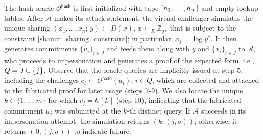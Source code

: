 \documentclass{iacrtrans}
\begin{document}
The hash oracle $\mathcal{O}^{\mathsf{hash}}$
is first initialized with tape
$[\hspace{0.5pt}h_1, \dots, h_m\hspace{0.5pt}]$
and empty lookup tables.
After $\mathcal{A}$ makes its attack statement,
the virtual challenger simulates the unique sharing
$(x_1, \dots, x_n;\hspace{2pt} y) \leftarrow D(x),
\hspace{2pt} x \leftarrow _R\mathbb{Z}_q,$ that is
subject to the constraint \eqref{shamir_sharing_constraint};
in particular, $x_j = \log y^*$.
It then generates commitments
$\{u_i\}_{i \in J}$ and feeds them
along with $y$ and $\{x_i\}_{i \in J}$
to $\mathcal{A}$, who proceeds
to impersonation
and generates a proof of the expected form,
i.e., $Q = J \cup \{\hspace{0.5pt}j\hspace{0.5pt}\}$.
Observe that the oracle queries are implicitly issued
at step 5, including the challenges
$c_i \leftarrow \mathcal{O}^{\mathsf{hash}}(u_i),\hspace{2pt} i \in Q$,
which are collected and attached to the fabricated
proof for later usage (steps 7-9).
We also locate the unique $k \in \{1, \dots, m\}$
for which $c_j = h\hspace{1pt}[\hspace{1pt}k\hspace{1pt}]$
(step 10), indicating that the fabricated commitment $u_j$
was submitted at the $k$-th distinct query.
If $\mathcal{A}$ succeeds in its impersonation attempt,
the simulation returns $(k, (j, \sigma))$; otherwise, it
returns $(\hspace{1pt}0, (j, \sigma))$
to indicate failure.
\end{document}

